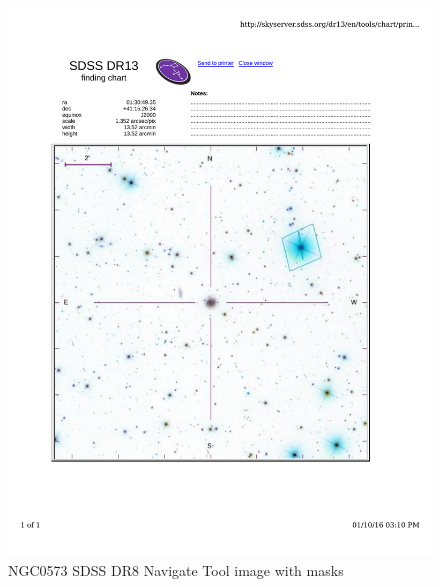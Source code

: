 \documentclass[10pt,letterpaper]{article}
\begin{document}
\begin{figure}[h!]
\centering
\includegraphics[scale=0.7]{figures/NGC0573.pdf}
\caption{NGC0573 SDSS DR8 Navigate Tool image with masks}
\end{figure}
\end{document}
